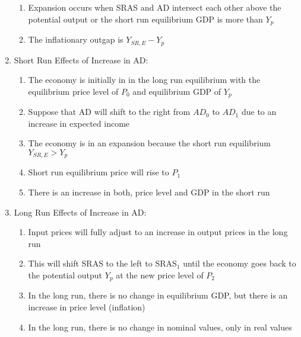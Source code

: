 \documentclass[12pt]{article}
\begin{document}
\begin{enumerate}
\begin{enumerate}
          \item Expansion occurs when SRAS and AD intersect each other above the potential output or the short run equilibrium GDP is more than $Y_p$

          \item The inflationary outgap is $Y_{SR,E}-Y_p$

        \end{enumerate}

      \item Short Run Effects of Increase in AD:

        \begin{enumerate}

          \item The economy is initially in in the long run equilibrium with the equilibrium price level of $P_0$ and equilibrium GDP of $Y_p$

          \item Suppose that AD will shift to the right from $AD_0$ to $AD_1$ due to an increase in expected income

          \item The economy is in an expansion because the short run equilibrium $Y_{SR,E}>Y_p$

          \item Short run equilibrium price will rise to $P_1$

          \item There is an increase in both, price level and GDP in the short run

        \end{enumerate}

      \item Long Run Effects of Increase in AD:

        \begin{enumerate}

          \item Input prices will fully adjust to an increase in output prices in the long run

          \item This will shift SRAS to the left to SRAS$_1$ until the economy goes back to the potential output $Y_p$ at the new price level of $P_2$

          \item In the long run, there is no change in equilibrium GDP, but there is an increase in price level (inflation)

          \item In the long run, there is no change in nominal values, only in real values


\end{enumerate}
\end{enumerate}
\end{document}
